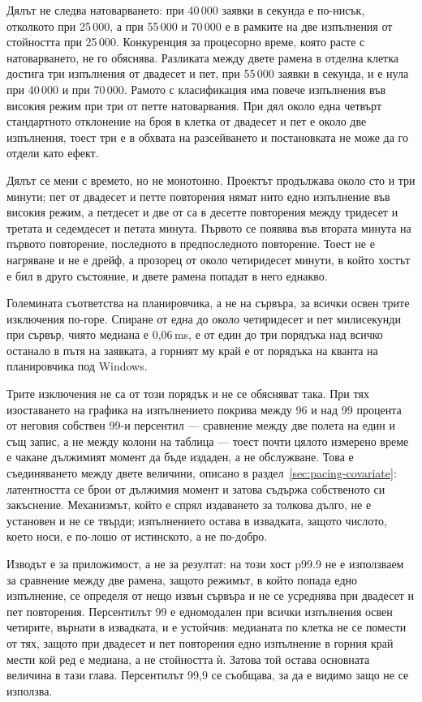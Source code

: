 Дялът не следва натоварването: при 40\,000 заявки в секунда е по-нисък, отколкото при
25\,000, а при 55\,000 и 70\,000 е в рамките на две изпълнения от стойността при 25\,000.
Конкуренция за процесорно време, която расте с натоварването, не го обяснява. Разликата между
двете рамена в отделна клетка достига три изпълнения от двадесет и пет, при 55\,000 заявки в
секунда, и е нула при 40\,000 и при 70\,000. Рамото с класификация има повече изпълнения във
високия режим при три от петте натоварвания. При дял около една четвърт стандартното
отклонение на броя в клетка от двадесет и пет е около две изпълнения, тоест три е в обхвата
на разсейването и постановката не може да го отдели като ефект.

Дялът се мени с времето, но не монотонно. Проектът продължава около сто и три минути; пет
от двадесет и петте повторения нямат нито едно изпълнение във високия режим, а петдесет и две
от  са в десетте повторения между тридесет и третата и
седемдесет и петата минута. Първото се появява във втората минута на първото повторение,
последното в предпоследното повторение. Тоест не е нагряване и не е дрейф, а прозорец от
около четиридесет минути, в който хостът е бил в друго състояние, и двете рамена попадат в
него еднакво.

Големината съответства на планировчика, а не на сървъра, за всички освен трите изключения
по-горе. Спиране от една до около четиридесет и пет милисекунди при сървър, чиято медиана е
0,06\,ms, е от един до три порядъка над всичко останало в пътя на заявката, а горният му край
е от порядъка на кванта на планировчика под Windows.

Трите изключения не са от този порядък и не се обясняват така. При тях изоставането на графика
на изпълнението покрива между 96 и над 99 процента от неговия собствен 99-и персентил — сравнение
между две полета на един и същ запис, а не между колони на таблица — тоест почти цялото измерено
време е чакане дължимият момент да бъде издаден, а не обслужване. Това е съединяването между двете величини, описано в
раздел~\ref{sec:pacing-covariate}: латентността се брои от дължимия момент и затова съдържа
собственото си закъснение. Механизмът, който е спрял издаването за толкова дълго, не е
установен и не се твърди; изпълнението остава в извадката, защото числото, което носи, е
по-лошо от истинското, а не по-добро.

Изводът е за приложимост, а не за резултат: на този хост p99.9 не е използваем за сравнение
между две рамена, защото режимът, в който попада едно изпълнение, се определя от нещо извън
сървъра и не се усреднява при двадесет и пет повторения. Персентилът 99 е едномодален при всички
изпълнения освен четирите, върнати в извадката, и е устойчив: медианата по
клетка не се помести от тях, защото при двадесет и пет повторения едно изпълнение в горния край
мести кой ред е медиана, а не стойността ѝ. Затова той остава основната величина в тази глава. Персентилът 99,9 се съобщава, за да е
видимо защо не се използва.

